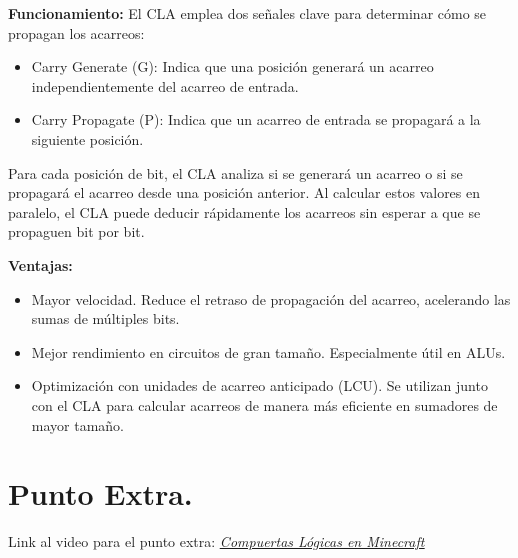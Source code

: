 \documentclass[12pt,letterpaper]{article}
\begin{document}
\begin{enumerate}
    \textbf{Funcionamiento:}
    El CLA emplea dos señales clave para determinar cómo se propagan los acarreos:
    \begin{itemize}
    \item Carry Generate (G): Indica que una posición generará un acarreo independientemente del acarreo de entrada.
    \item Carry Propagate (P): Indica que un acarreo de entrada se propagará a la siguiente posición.
    \end{itemize}
    Para cada posición de bit, el CLA analiza si se generará un acarreo o si se propagará el acarreo desde una posición anterior. Al calcular estos valores en paralelo, el CLA puede deducir rápidamente los acarreos sin esperar a que se propaguen bit por bit.
    
    \textbf{Ventajas:}
    \begin{itemize}
    \item Mayor velocidad. Reduce el retraso de propagación del acarreo, acelerando las sumas de múltiples bits.
    \item Mejor rendimiento en circuitos de gran tamaño. Especialmente útil en ALUs.
    \item Optimización con unidades de acarreo anticipado (LCU). Se utilizan junto con el CLA para calcular acarreos de manera más eficiente en sumadores de mayor tamaño.
    \end{itemize}

    \bigskip
\end{enumerate}

\section*{Punto Extra.}
Link al video para el punto extra:
\href{https://drive.google.com/file/d/1P7wGbd6McrWZda3zwOVueDhKDfkiJzHR/view?usp=drivesdk}{\textit{\uline{Compuertas Lógicas en Minecraft}}}
\end{document}
